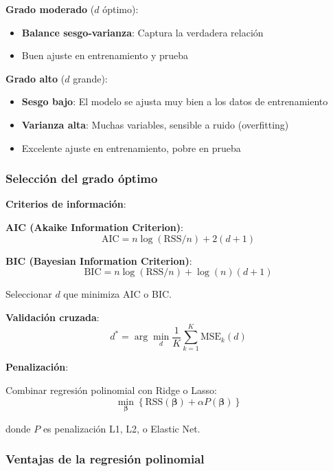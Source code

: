 \documentclass[
  doc,
  floatsintext,
  longtable,
  a4paper,
  nolmodern,
  notxfonts,
  notimes,
  12pt,
  colorlinks=true,linkcolor=blue,citecolor=blue,urlcolor=blue]{apa7}
\providecommand{\tightlist}{%
  \setlength{\itemsep}{0pt}\setlength{\parskip}{0pt}}
\begin{document}
\textbf{Grado moderado} (\(d\) óptimo):

\begin{itemize}
\tightlist
\item
  \textbf{Balance sesgo-varianza}: Captura la verdadera relación
\item
  Buen ajuste en entrenamiento y prueba
\end{itemize}

\textbf{Grado alto} (\(d\) grande):

\begin{itemize}
\tightlist
\item
  \textbf{Sesgo bajo}: El modelo se ajusta muy bien a los datos de
  entrenamiento
\item
  \textbf{Varianza alta}: Muchas variables, sensible a ruido
  (overfitting)
\item
  Excelente ajuste en entrenamiento, pobre en prueba
\end{itemize}

\subsubsection{Selección del grado
óptimo}\label{selecciuxf3n-del-grado-uxf3ptimo}

\textbf{Criterios de información}:

\textbf{AIC (Akaike Information Criterion)}: \[
\text{AIC} = n \log(\text{RSS}/n) + 2(d+1)
\]

\textbf{BIC (Bayesian Information Criterion)}: \[
\text{BIC} = n \log(\text{RSS}/n) + \log(n)(d+1)
\]

Seleccionar \(d\) que minimiza AIC o BIC.

\textbf{Validación cruzada}: \[
d^* = \arg\min_{d} \frac{1}{K} \sum_{k=1}^{K} \text{MSE}_k(d)
\]

\textbf{Penalización}:

Combinar regresión polinomial con Ridge o Lasso: \[
\min_{\boldsymbol{\beta}} \left\{ \text{RSS}(\boldsymbol{\beta}) + \alpha P(\boldsymbol{\beta}) \right\}
\]

donde \(P\) es penalización L1, L2, o Elastic Net.

\subsubsection{Ventajas de la regresión
polinomial}\label{ventajas-de-la-regresiuxf3n-polinomial}
\end{document}

